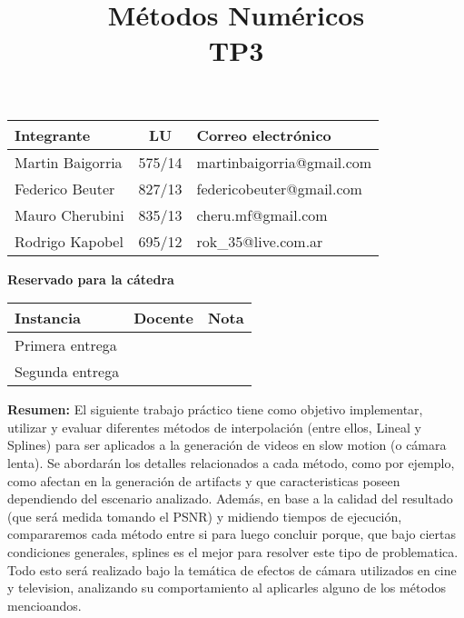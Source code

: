 \documentclass[10pt,a4paper]{article}
\title{Métodos Numéricos \\ TP3}
\begin{document}
\maketitle

\bigskip

\begin{table}[h]
\centering
\begin{tabular}{|l l l|}
\hline
Integrante       & \multicolumn{1}{c}{LU}     & Correo electrónico        \\ \hline
Martin Baigorria & \multicolumn{1}{c}{575/14} & martinbaigorria@gmail.com \\ 
Federico Beuter & 827/13                      & federicobeuter@gmail.com \\
Mauro Cherubini & 835/13                      & cheru.mf@gmail.com \\ 
Rodrigo Kapobel & 695/12                      & rok\_35@live.com.ar \\  \hline
\end{tabular}
\end{table}

\begin{center}
\textbf{Reservado para la cátedra}
\end{center}
\begin{table}[h]
\centering
\begin{tabular}{|l|l|l|}
\hline
Instancia       & Docente & Nota \\ \hline
Primera entrega &         &      \\ \hline
Segunda entrega &         &      \\ \hline
\end{tabular}
\end{table}

\vfill
\textbf{Resumen:} 
El siguiente trabajo práctico tiene como objetivo implementar, utilizar y evaluar diferentes métodos de interpolación (entre ellos, Lineal y Splines) para ser aplicados a la generación de videos en slow motion (o cámara lenta). Se abordarán los detalles relacionados a cada método, como por ejemplo, como afectan en la generación de artifacts y que caracteristicas poseen dependiendo del escenario analizado. Además, en base a la calidad del resultado (que será medida tomando el PSNR) y midiendo tiempos de ejecución, compararemos cada método entre si para luego concluir porque, que bajo ciertas condiciones generales, splines es el mejor para resolver este tipo de problematica. Todo esto será realizado bajo la temática de efectos de cámara utilizados en cine y television, analizando su comportamiento al aplicarles alguno de los métodos mencioandos.
\end{document}
